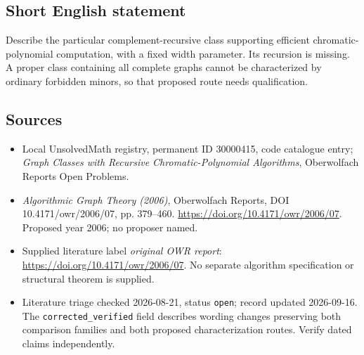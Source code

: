 \documentclass[11pt]{article}
\begin{document}
\subsection{Short English statement}
Describe the particular complement-recursive class supporting efficient chromatic-polynomial computation, with a fixed width parameter. Its recursion is missing. A proper class containing all complete graphs cannot be characterized by ordinary forbidden minors, so that proposed route needs qualification.
\subsection{Sources}
\begin{itemize}\item Local UnsolvedMath registry, permanent ID 30000415, code catalogue entry; \emph{Graph Classes with Recursive Chromatic-Polynomial Algorithms}, Oberwolfach Reports Open Problems.\item \emph{Algorithmic Graph Theory (2006)}, Oberwolfach Reports, DOI 10.4171/owr/2006/07, pp. 379--460. \url{https://doi.org/10.4171/owr/2006/07}. Proposed year 2006; no proposer named.\item Supplied literature label \emph{original OWR report}: \url{https://doi.org/10.4171/owr/2006/07}. No separate algorithm specification or structural theorem is supplied.\item Literature triage checked 2026-08-21, status \texttt{open}; record updated 2026-09-16. The \texttt{corrected\_verified} field describes wording changes preserving both comparison families and both proposed characterization routes. Verify dated claims independently.\end{itemize}
\end{document}
